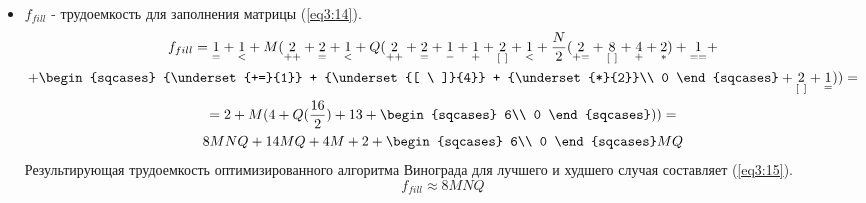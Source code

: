 \begin{itemize}
	\item $f_{fill}$ - трудоемкость для заполнения матрицы (\ref{eq3:14}).
	\begin{multline}
		f_{fill} = {\underset{=}{1}} + {\underset{<}{1}} + M({\underset{++}{2}} + {\underset{=}{2}} + {\underset{<}{1}} + Q({\underset{++}{2}} + {\underset{=}{2}} + {\underset{-}{1}} + {\underset{+}{1}} + {\underset{[\ ]}{2}} + {\underset{<}{1}} + \frac{N}{2}({\underset{+=}{2}} + {\underset{[\ ]}{8}} + {\underset{+}{4}} + {\underset{*}{2}}) + {\underset{==}{1}} + \\
		 +  \begin{sqcases}
				{\underset{+=}{1}} + {\underset{[ \ ]}{4}} + {\underset{*}{2}}\\
				0
			\end{sqcases} + {\underset{[\ ]}{2}} + {\underset{=}{1}})) = \\
		= 2 + M(4 + Q(\frac{16}{2}) + 13 + \begin{sqcases}
											6\\
											0
											\end{sqcases})) = \\
		8MNQ + 14MQ + 4M + 2 + \begin{sqcases}
									6\\
									0
									\end{sqcases} MQ
		\label{eq3:14}
	\end{multline}
	Результирующая трудоемкость оптимизированного алгоритма Винограда для лучшего и худшего случая составляет (\ref{eq3:15}).
	\begin{equation}
		f_{fill} \approx 8MNQ
		\label{eq3:15}
	\end{equation}
	
\end{itemize}


